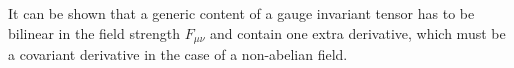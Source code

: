 \documentclass[12pt,preprintnumbers,nofootinbib]{revtex4}
\begin{document}
	It can be shown that a generic content of a gauge
	invariant tensor has to be bilinear in the field strength  $ F_{\mu\nu} $ 
     and contain one extra derivative, 
	which must be a covariant derivative in the case of a non-abelian field.

\end{document}
